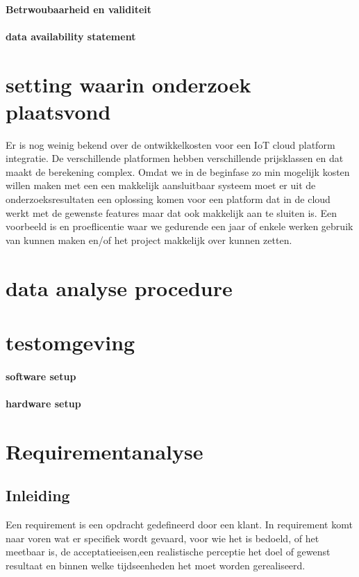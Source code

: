 \paragraph{Betrwoubaarheid en validiteit}

\paragraph{data availability statement}

\section{setting waarin onderzoek plaatsvond}
Er is nog weinig bekend over de ontwikkelkosten voor een IoT cloud platform integratie. De verschillende platformen hebben verschillende prijsklassen en dat maakt de berekening complex. Omdat we in de beginfase zo min mogelijk kosten willen maken met een een makkelijk aansluitbaar systeem moet er uit de onderzoeksresultaten een oplossing komen voor een platform dat in de cloud werkt met de gewenste features maar dat ook makkelijk aan te sluiten is. Een voorbeeld is en proeflicentie waar we gedurende een jaar of enkele werken gebruik van kunnen maken en/of het project makkelijk over kunnen zetten.

\section{data analyse procedure}

\section{testomgeving}

\paragraph{software setup}



\paragraph{hardware setup}

   
\section{Requirementanalyse}

\subsection{Inleiding}
Een requirement is een opdracht gedefineerd door een klant. In requirement komt naar voren wat er specifiek wordt gevaard, voor wie het is bedoeld, of het meetbaar is,  de acceptatieeisen,een realistische perceptie  het doel of gewenst resultaat en binnen welke tijdseenheden het moet worden gerealiseerd.
 




